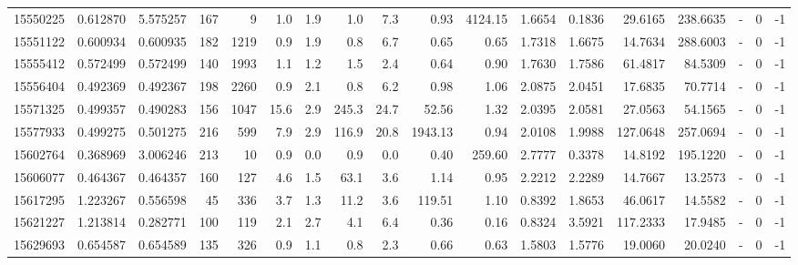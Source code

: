 \begin{tabular}{rrrrrrrrrrrrrrrlrr}
  15550225 & 0.612870 &   5.575257 &  167 &    9 &      1.0 &      1.9 &     1.0 &      7.3 &       0.93 &     4124.15 &  1.6654 &  0.1836 &   29.6165 &  238.6635 &             - &        0 &         -1 \\
  15551122 & 0.600934 &   0.600935 &  182 & 1219 &      0.9 &      1.9 &     0.8 &      6.7 &       0.65 &        0.65 &  1.7318 &  1.6675 &   14.7634 &  288.6003 &             - &        0 &         -1 \\
  15555412 & 0.572499 &   0.572499 &  140 & 1993 &      1.1 &      1.2 &     1.5 &      2.4 &       0.64 &        0.90 &  1.7630 &  1.7586 &   61.4817 &   84.5309 &             - &        0 &         -1 \\
  15556404 & 0.492369 &   0.492367 &  198 & 2260 &      0.9 &      2.1 &     0.8 &      6.2 &       0.98 &        1.06 &  2.0875 &  2.0451 &   17.6835 &   70.7714 &             - &        0 &         -1 \\
  15571325 & 0.499357 &   0.490283 &  156 & 1047 &     15.6 &      2.9 &   245.3 &     24.7 &      52.56 &        1.32 &  2.0395 &  2.0581 &   27.0563 &   54.1565 &             - &        0 &         -1 \\
  15577933 & 0.499275 &   0.501275 &  216 &  599 &      7.9 &      2.9 &   116.9 &     20.8 &    1943.13 &        0.94 &  2.0108 &  1.9988 &  127.0648 &  257.0694 &             - &        0 &         -1 \\
  15602764 & 0.368969 &   3.006246 &  213 &   10 &      0.9 &      0.0 &     0.9 &      0.0 &       0.40 &      259.60 &  2.7777 &  0.3378 &   14.8192 &  195.1220 &             - &        0 &         -1 \\
  15606077 & 0.464367 &   0.464357 &  160 &  127 &      4.6 &      1.5 &    63.1 &      3.6 &       1.14 &        0.95 &  2.2212 &  2.2289 &   14.7667 &   13.2573 &             - &        0 &         -1 \\
  15617295 & 1.223267 &   0.556598 &   45 &  336 &      3.7 &      1.3 &    11.2 &      3.6 &     119.51 &        1.10 &  0.8392 &  1.8653 &   46.0617 &   14.5582 &             - &        0 &         -1 \\
  15621227 & 1.213814 &   0.282771 &  100 &  119 &      2.1 &      2.7 &     4.1 &      6.4 &       0.36 &        0.16 &  0.8324 &  3.5921 &  117.2333 &   17.9485 &             - &        0 &         -1 \\
  15629693 & 0.654587 &   0.654589 &  135 &  326 &      0.9 &      1.1 &     0.8 &      2.3 &       0.66 &        0.63 &  1.5803 &  1.5776 &   19.0060 &   20.0240 &             - &        0 &         -1 \\

\end{tabular}
